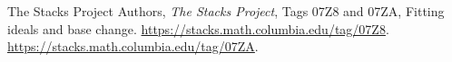 The Stacks Project Authors,
\emph{The Stacks Project}, Tags 07Z8 and 07ZA,
Fitting ideals and base change.
\url{https://stacks.math.columbia.edu/tag/07Z8}.
\url{https://stacks.math.columbia.edu/tag/07ZA}.
